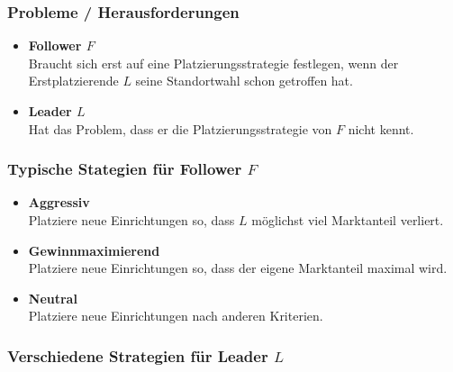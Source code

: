       \subsubsection{Probleme / Herausforderungen} %
      \label{ssub:probleme_herausforderungen}
        \begin{itemize}
          \item \textbf{Follower $F$}\\
           Braucht sich erst auf eine Platzierungsstrategie festlegen, wenn der Erstplatzierende $L$ seine Standortwahl schon getroffen hat.
          \item \textbf{Leader $L$}\\
          Hat das Problem, dass er die Platzierungsstrategie von $F$ nicht kennt.
        \end{itemize}

      \subsubsection{Typische Stategien für Follower $F$} %
      \label{ssub:typische_stategien_für_follower}

        \begin{itemize}
          \item \textbf{Aggressiv}\\
          Platziere neue Einrichtungen so, dass $L$ möglichst viel Marktanteil verliert. 

          \item \textbf{Gewinnmaximierend}\\
          Platziere neue Einrichtungen so, dass der eigene Marktanteil maximal wird.

          \item \textbf{Neutral}\\
          Platziere neue Einrichtungen nach anderen Kriterien.
        \end{itemize}
      

      \subsubsection{Verschiedene Strategien für Leader $L$} %
      \label{ssub:verschiedene_strategien_für_leader_}
      
